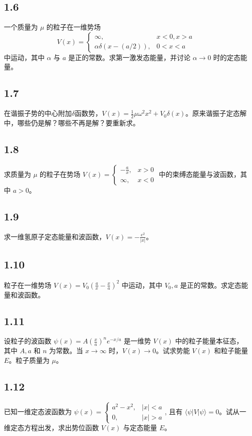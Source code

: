 \subsection{1.6}
一个质量为 $\mu$ 的粒子在一维势场
$$V(x) = 
\begin{cases} 
\infty, & x < 0, x > a \\
\alpha \delta \left( x - (a/2) \right), & 0 < x < a 
\end{cases}$$
中运动，其中 $\alpha$ 与 $a$ 是正的常数。求第一激发态能量，并讨论 $\alpha \to 0$ 时的定态能量。

\subsection{1.7}
在谐振子势的中心附加$\delta$函数势，$V(x) = \frac{1}{2} \mu \omega^2 x^2 + V_0 \delta (x)$。原来谐振子定态解中，哪些仍是解？哪些不再是解？要重新求。

\subsection{1.8}
求质量为 $\mu$ 的粒子在势场 $V(x) = \begin{cases} 
-\frac{a}{x}, & x > 0 \\ 
\infty, & x < 0 
\end{cases}$ 中的束缚态能量与波函数，其中 $a > 0$。

\subsection{1.9}
求一维氢原子定态能量和波函数，$V(x) = -\frac{e^2}{|x|}$。

\subsection{1.10}
粒子在一维势场 $V(x) = V_0 \left( \frac{a}{x} - \frac{x}{a} \right)^2$ 中运动，其中 $V_0, a$ 是正的常数。求定态能量和波函数。

\subsection{1.11}
设粒子的波函数 $\psi(x) = A \left( \frac{x}{a} \right)^n e^{-x/a}$ 是一维势 $V(x)$ 中的粒子能量本征态，其中 $A, a$ 和 $n$ 为常数。当 $x \to \infty$ 时，$V(x) \to 0$。试求势能 $V(x)$ 和粒子能量 $E$。粒子质量为 $\mu$。

\subsection{1.12}
已知一维定态波函数为 $\psi(x) = \begin{cases} 
a^2 - x^2, & |x| < a \\
0, & |x| > a 
\end{cases}$, 且有 $\langle \psi | V | \psi \rangle = 0$。试从一维定态方程出发，求出势位函数 $V(x)$ 与定态能量 $E$。


